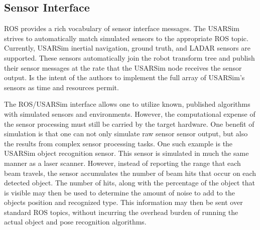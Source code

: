 \subsection*{Sensor Interface} 
ROS provides a rich vocabulary of sensor interface messages. The USARSim strives to automatically match simulated sensors to the appropriate ROS topic. Currently, USARSim inertial navigation, ground truth, and LADAR sensors are supported. These sensors automatically join the robot transform tree and publish their sensor messages at the rate that the USARSim node receives the sensor output. Is the intent of the authors to implement the full array of USARSim's sensors as time and resources permit.

The ROS/USARSim interface allows one to utilize known, published algorithms with simulated sensors and environments. However, the computational expense of the sensor processing must still be carried by the target hardware. One benefit of simulation is that one can not only simulate raw sensor sensor output, but also the results from complex sensor processing tasks. One such example is the USARSim object recognition sensor. This sensor  is simulated in much the same manner as a laser scanner. However, instead of reporting the range that each beam travels, the sensor accumulates the number of beam hits that occur on each detected object. The number of hits, along with the percentage of the object that is visible may then be used to determine the amount of noise to add to the objects position and recognized type. This information may then be sent over standard ROS topics, without incurring the overhead burden of running the actual object and pose recognition algorithms.
